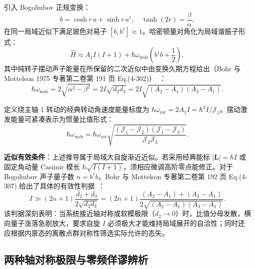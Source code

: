 引入 Bogoliubov 正规变换：
\begin{equation}\label{eq:3-2-bogoliubov}
b = \cosh r \, a + \sinh r \, a^\dagger, \quad \tanh(2r) = \frac{\beta}{\alpha},
\end{equation}
在同一局域近似下满足玻色对易子 $[b, b^\dagger] \approx 1$。哈密顿量对角化为局域谐振子形式：
\begin{equation}\label{eq:3-2-diagonalized-H}
\hat{H} \approx A_1 I(I+1) + \hbar \omega_{\text{wob}} \left( b^\dagger b + \frac{1}{2} \right),
\end{equation}
其中纯转子摆动声子能量在所保留的二次近似中由变换久期方程给出（Bohr 与 Mottelson 1975 专著第二卷第 191 页 Eq.(4-302)）~\cite{book-bohr-mottelson-nuclear-structure-vol2}：
\begin{equation}\label{eq:3-2-wobbling-freq-constants}
\hbar \omega_{\text{wob}} = 2 \sqrt{\alpha^2 - \beta^2} = 2I \sqrt{d_2 d_3} = 2I \sqrt{(A_2 - A_1)(A_3 - A_1)}.
\end{equation}

定义绕主轴 1 转动的经典转动角速度能量标度为 $\hbar \omega_{\text{rot}} = 2 A_1 I = \hbar^2 I / \mathcal{J}_1$。摆动激发能量可紧凑表示为惯量比值形式：
\begin{equation}\label{eq:3-2-wobbling-freq-inertia}
\hbar \omega_{\text{wob}} = \hbar \omega_{\text{rot}} \sqrt{\frac{(\mathcal{J}_1 - \mathcal{J}_2)(\mathcal{J}_1 - \mathcal{J}_3)}{\mathcal{J}_2 \mathcal{J}_3}}.
\end{equation}

\textbf{近似有效条件}：上述推导属于局域大自旋渐近近似。若采用经典能标 $|\boldsymbol{L}| = \hbar I$ 或固定角动量 Casimir 模长 $\hbar \sqrt{I(I+1)}$，须相应微调高阶零点能修正。对于 Bogoliubov 声子量子数 $n = b^\dagger b$，Bohr 与 Mottelson 专著第二卷第 192 页 Eq.(4-307) 给出了具体的有效性判据~\cite{book-bohr-mottelson-nuclear-structure-vol2}：
\begin{equation}\label{eq:3-2-validity-condition}
I \gg (2n + 1) \frac{d_2 + d_3}{2\sqrt{d_2 d_3}} = (2n + 1) \frac{(A_2 - A_1) + (A_3 - A_1)}{2\sqrt{(A_2 - A_1)(A_3 - A_1)}}.
\end{equation}
该判据深刻表明：当系统接近轴对称或软模极限（$d_2 \to 0$）时，比值分母发散，横向量子涨落急剧放大，要求自旋 $I$ 必须极大才能维持局域展开的自洽性；同时还应根据内禀态的离散点群对称性筛选实际允许的态矢。

\subsection{两种轴对称极限与零频佯谬辨析}\label{sec:3-2-4}

